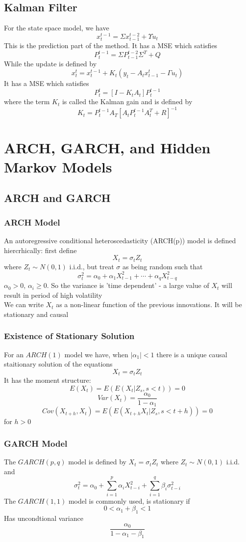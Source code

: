 \documentclass[11pt]{article}
\begin{document}
\subsection{Kalman Filter}
For the state space model, we have 
\[x_t^{t-1} = \Sigma x_{t-1}^{t-2} + \Upsilon u_t\]   
This is the prediction part of the method. It has a MSE which satisfies 
\[P_t^{t-1} = \Sigma P_{t-1}^{t-2}\Sigma^T + Q\]
While the update is defined by 
\[x_t^t = x_t^{t-1} + K_t(y_t - A_tx_{t-1}^t - \Gamma u_t)\] It has a MSE which satisfies 
\[P_t^t = [I - K_tA_t]P_t^{t-1}\]
where the term $K_t$ is called the Kalman gain and is defined by 
\[K_t = P_t^{t-1}A_T[A_tP_t^{t-1}A_t^T + R]^{-1}\]

\newpage 
\section{ARCH, GARCH, and Hidden Markov Models}
\subsection{ARCH and GARCH}
\subsubsection{ARCH Model}
An autoregressive conditional heteroscedasticity (ARCH(p)) model is defined hiercrhically: first define 
\[X_t = \sigma_tZ_t\]
where $Z_t\sim N(0,1)$ i.i.d., but treat $\sigma$ as being random such that 
\[\sigma_t^2 = \alpha_0 + \alpha_1X_{t-1}^2 + \cdots + \alpha_qX_{t-q}^2\]
$\alpha_0>0$, $\alpha_i\geq0$. So the variance is 'time dependent' - a large value of $X_t$ will result in period of high volatility \\
We can write $X_t$ as a non-linear function of the previous innovations. It will be stationary and causal 
\subsubsection{Existence of Stationary Solution}
For an $ARCH(1)$ model we have, when $|\alpha_1|<1$ there is a unique causal staitionary solution of the equations 
\[X_t = \sigma_tZ_t\]
It has the moment structure:
\[E(X_t) = E(E(X_t|Z_s,s<t)) = 0\]
\[Var(X_t) = \frac{\alpha_0}{1-\alpha_1}\]
\[Cov(X_{t+h},X_t) = E(E(X_{t+h}X_t|Z_s,s<t+h))=0\]
for $h>0 $ 
\subsubsection{GARCH Model}
The $GARCH(p,q)$ model is defined by $X_t=\sigma_tZ_t$ where $Z_t\sim N(0,1)$ i.i.d. and
\[\sigma_t^2 = \alpha_0 + \sum_{i=1}^{p}\alpha_iX_{t-i}^2 + \sum_{i=1}^{q}\beta_i\sigma_{t-i}^2\]
The $GARCH(1,1)$ model is commonly used, is stationary if 
\[0<\alpha_1 + \beta_1 < 1\]
Has uncondtional variance 
\[\frac{\alpha_0}{1-\alpha_1-\beta_1}\]
\end{document}
